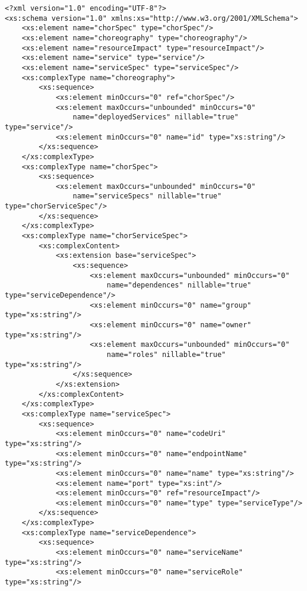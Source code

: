 {\footnotesize
\begin{lstlisting}[frame=trbl, label=lst:xsd, caption=\emph{Schema} em formato XSD da Linguagem de Descrição Arquitetural utilizada no \ee] 
<?xml version="1.0" encoding="UTF-8"?>
<xs:schema version="1.0" xmlns:xs="http://www.w3.org/2001/XMLSchema">
    <xs:element name="chorSpec" type="chorSpec"/>
    <xs:element name="choreography" type="choreography"/>
    <xs:element name="resourceImpact" type="resourceImpact"/>
    <xs:element name="service" type="service"/>
    <xs:element name="serviceSpec" type="serviceSpec"/>
    <xs:complexType name="choreography">
        <xs:sequence>
            <xs:element minOccurs="0" ref="chorSpec"/>
            <xs:element maxOccurs="unbounded" minOccurs="0"
                name="deployedServices" nillable="true" type="service"/>
            <xs:element minOccurs="0" name="id" type="xs:string"/>
        </xs:sequence>
    </xs:complexType>
    <xs:complexType name="chorSpec">
        <xs:sequence>
            <xs:element maxOccurs="unbounded" minOccurs="0"
                name="serviceSpecs" nillable="true" type="chorServiceSpec"/>
        </xs:sequence>
    </xs:complexType>
    <xs:complexType name="chorServiceSpec">
        <xs:complexContent>
            <xs:extension base="serviceSpec">
                <xs:sequence>
                    <xs:element maxOccurs="unbounded" minOccurs="0"
                        name="dependences" nillable="true" type="serviceDependence"/>
                    <xs:element minOccurs="0" name="group" type="xs:string"/>
                    <xs:element minOccurs="0" name="owner" type="xs:string"/>
                    <xs:element maxOccurs="unbounded" minOccurs="0"
                        name="roles" nillable="true" type="xs:string"/>
                </xs:sequence>
            </xs:extension>
        </xs:complexContent>
    </xs:complexType>
    <xs:complexType name="serviceSpec">
        <xs:sequence>
            <xs:element minOccurs="0" name="codeUri" type="xs:string"/>
            <xs:element minOccurs="0" name="endpointName" type="xs:string"/>
            <xs:element minOccurs="0" name="name" type="xs:string"/>
            <xs:element name="port" type="xs:int"/>
            <xs:element minOccurs="0" ref="resourceImpact"/>
            <xs:element minOccurs="0" name="type" type="serviceType"/>
        </xs:sequence>
    </xs:complexType>
    <xs:complexType name="serviceDependence">
        <xs:sequence>
            <xs:element minOccurs="0" name="serviceName" type="xs:string"/>
            <xs:element minOccurs="0" name="serviceRole" type="xs:string"/>

\end{lstlisting}}
